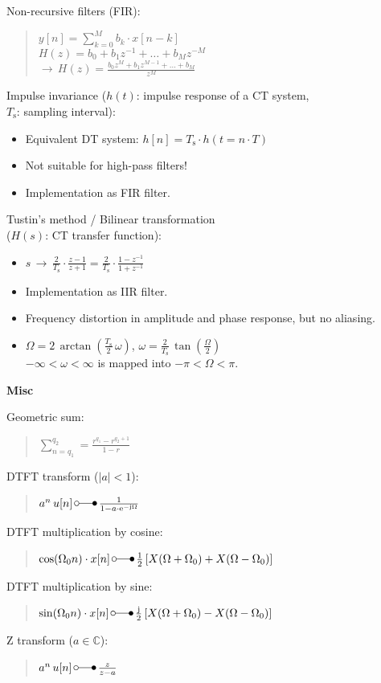 \documentclass[fontsize=9pt,a4paper,twocolumn]{scrartcl}
\begin{document}
Non-recursive filters (FIR):
\begin{quote}
	$y[n] = \sum_{k=0}^M b_k\cdot x[n-k]$\\
	$H(z) = b_0+b_1 z^{-1}+\dots+b_M z^{-M}$\\
	$\to\,H(z)=\frac{b_0 z^M+b_1 z^{M-1}+\dots+b_M}{z^M}$
\end{quote}


Impulse invariance ($h(t)$: impulse response of a CT system,\\ $T_\mathrm{s}$: sampling interval):
\begin{itemize}
	\item Equivalent DT system: $h[n]=T_\mathrm{s}\cdot h(t=n\cdot T)$
	\item Not suitable for high-pass filters!
	\item Implementation as FIR filter.
\end{itemize}

Tustin's method / Bilinear transformation \\($H(s)$: CT transfer function):
\begin{itemize}
	\item $s\,\to\,\frac{2}{T_\mathrm{s}}\cdot\frac{z-1}{z+1}=\frac{2}{T_\mathrm{s}}\cdot\frac{1-z^{-1}}{1+z^{-1}}$
	\item Implementation as IIR filter.
	\item Frequency distortion in amplitude and phase response, but no aliasing.
	\item $\Omega=2\,\arctan\left(\frac{T_\mathrm{s}}{2}\,\omega\right)$, $\omega=\frac{2}{T_\mathrm{s}}\,\tan\left(\frac{\Omega}{2}\right)$\\
		$-\infty <\omega<\infty$ is mapped into $-\pi<\Omega<\pi$.
\end{itemize}

\large{\textbf{Misc}}

Geometric sum:
\begin{quote}
	$\sum_{n=q_1}^{q_2} = \frac{r^{q_1} - r^{q_2+1}}{1-r}$
\end{quote}

DTFT transform ($|a|<1$):
\begin{quote}
	$a^n\, u[n]\,\laplace\,\frac{1}{1-a\cdot\mathrm{e}^{-\mathrm{j}\Omega}}$
\end{quote}

DTFT multiplication by cosine:
\begin{quote}
	$\cos(\Omega_0 n)\cdot x[n]\,\laplace\,\frac{1}{2}\left[X(\Omega+\Omega_0)+X(\Omega-\Omega_0)\right]$
\end{quote}

DTFT multiplication by sine:
\begin{quote}
	$\sin(\Omega_0 n)\cdot x[n]\,\laplace\,\frac{\mathrm{j}}{2}\left[X(\Omega+\Omega_0)-X(\Omega-\Omega_0)\right]$
\end{quote}

Z transform ($a\in\mathbb{C}$):
\begin{quote}
	$a^n\, u[n]\,\laplace\,\frac{z}{z-a}$
\end{quote}
\end{document}
